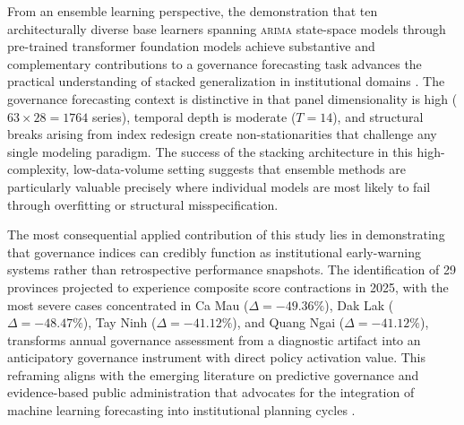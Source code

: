 \documentclass[12pt,a4paper]{article}
\begin{document}
From an ensemble learning perspective, the demonstration that ten architecturally diverse base learners spanning \textsc{arima} state-space models through pre-trained transformer foundation models achieve substantive and complementary contributions to a governance forecasting task advances the practical understanding of stacked generalization in institutional domains \citep{Wolpert1992, Bates1969}. The governance forecasting context is distinctive in that panel dimensionality is high ($63 \times 28 = 1764$ series), temporal depth is moderate ($T = 14$), and structural breaks arising from index redesign create non-stationarities that challenge any single modeling paradigm. The success of the stacking architecture in this high-complexity, low-data-volume setting suggests that ensemble methods are particularly valuable precisely where individual models are most likely to fail through overfitting or structural misspecification.

The most consequential applied contribution of this study lies in demonstrating that governance indices can credibly function as institutional early-warning systems rather than retrospective performance snapshots. The identification of 29 provinces projected to experience composite score contractions in 2025, with the most severe cases concentrated in Ca Mau ($\Delta = -49.36\%$), Dak Lak ($\Delta = -48.47\%$), Tay Ninh ($\Delta = -41.12\%$), and Quang Ngai ($\Delta = -41.12\%$), transforms annual governance assessment from a diagnostic artifact into an anticipatory governance instrument with direct policy activation value. This reframing aligns with the emerging literature on predictive governance and evidence-based public administration that advocates for the integration of machine learning forecasting into institutional planning cycles \citep{Maffei2020, Athey2017, Williamson2016}.
\end{document}
